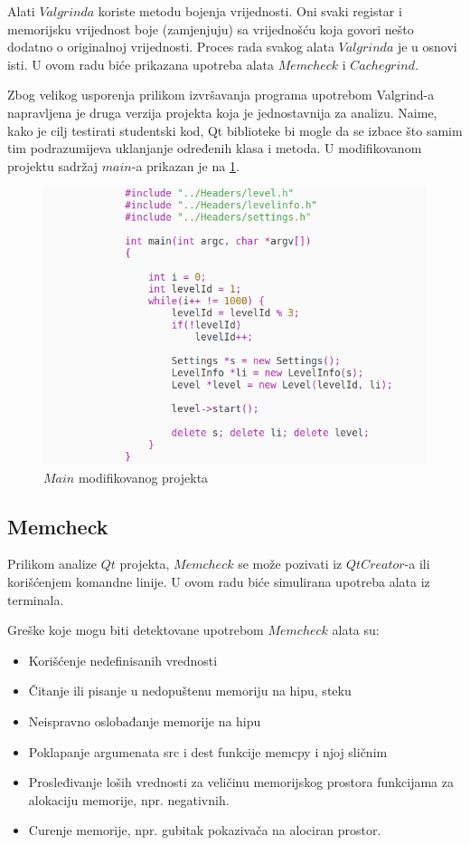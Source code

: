\documentclass[a4paper]{article}
\begin{document}
Alati $Valgrinda$ koriste metodu bojenja vrijednosti. Oni svaki registar i memorijsku vrijednost boje (zamjenjuju) sa vrijednošću koja govori nešto dodatno o originalnoj vrijednosti. Proces rada svakog alata $Valgrinda$ je u osnovi isti. U ovom radu biće prikazana upotreba alata $Memcheck$ i $Cachegrind$. \cite{verifikacija2}

Zbog velikog usporenja prilikom izvršavanja programa upotrebom Valgrind-a napravljena je druga verzija projekta koja je jednostavnija za analizu. Naime, kako je cilj testirati studentski kod, Qt biblioteke bi mogle da se izbace što samim tim podrazumijeva uklanjanje određenih klasa i metoda. U modifikovanom projektu sadržaj $main$-a prikazan je na \ref{fig:main}.

	\begin{figure}[h!]
		\centering
		\caption{$Main$ modifikovanog projekta}
		\label{fig:main}
		\includegraphics[scale=0.5]{../ProjectAnalysisReport/main1.png}
	\end{figure}

	\subsection{Memcheck}
	Prilikom analize $Qt$ projekta, $Memcheck$ se može pozivati iz $QtCreator$-a ili korišćenjem komandne linije. U ovom radu biće simulirana upotreba alata iz terminala. 
	
Greške koje mogu biti detektovane upotrebom $Memcheck$ alata su:
\begin{itemize}
	\item Korišćenje nedefinisanih vrednosti
	\item Čitanje ili pisanje u nedopuštenu memoriju na hipu, steku
	\item Neispravno oslobađanje memorije na hipu
	\item Poklapanje argumenata src i dest funkcije memcpy i njoj sličnim
	\item Prosleđivanje loših vrednosti za veličinu memorijskog prostora funkcijama za alokaciju memorije, npr. negativnih.
	\item Curenje memorije, npr. gubitak pokazivača na alociran prostor.
\end{itemize}
\end{document}
